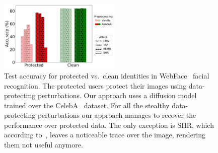 \documentclass[conference]{IEEEtran}
\theoremstyle{definition}
\theoremstyle{remark}
\theoremstyle{proposition}
\begin{document}
\begin{figure}[tb!]
	\centering
	\includegraphics[width=0.52\textwidth]{Inc_WebFace.jpg}
	\caption{Test accuracy for protected vs.~clean identities in WebFace~\citep{yi2014} facial recognition. The protected users protect their images using data-protecting perturbations. Our approach uses a diffusion model trained over the CelebA~\citep{liu2015deep} dataset. For all the stealthy data-protecting perturbations our approach manages to recover the performance over protected data. The only exception is SHR, which according to~, leaves a noticeable trace over the image, rendering them not useful anymore.}
	\label{fig:webface}
\end{figure}
\end{document}
